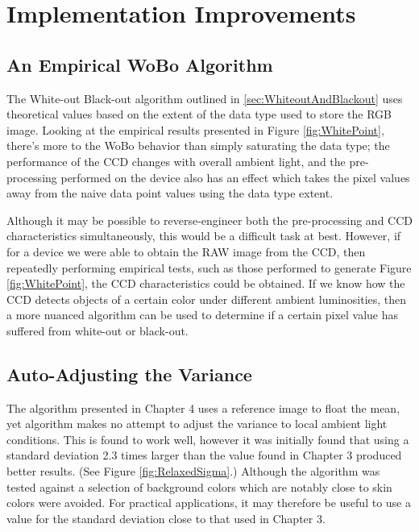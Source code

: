 \section{Implementation Improvements}\label{sec:ImplementationImprovements}

\subsection{An Empirical WoBo Algorithm}\label{sec:EmpicialWoBoAlgorithm}
The White-out Black-out algorithm outlined in \ref{sec:WhiteoutAndBlackout} uses theoretical values based on the extent of the data type used to store the RGB image. Looking at the empirical results presented in Figure \ref{fig:WhitePoint}, there's more to the WoBo behavior than simply saturating the data type; the performance of the CCD changes with overall ambient light, and the pre-processing performed on the device also has an effect which takes the pixel values away from the naive data point values using the data type extent. 

Although it may be possible to reverse-engineer both the pre-processing and CCD characteristics simultaneously, this would be a difficult task at best. However, if for a device we were able to obtain the RAW image from the CCD, then repeatedly performing empirical tests, such as those performed to generate Figure \ref{fig:WhitePoint}, the CCD characteristics could be obtained. If we know how the CCD detects objects of a certain color under different ambient luminosities, then a more nuanced algorithm can be used to determine if a certain pixel value has suffered from white-out or black-out.

\subsection{Auto-Adjusting the Variance}\label{sec:AutoAdjustingTheVariance}
The algorithm presented in Chapter 4 uses a reference image to float the mean, yet algorithm makes no attempt to adjust the variance to local ambient light conditions. This is found to work well, however it was initially found that using a standard deviation 2.3 times larger than the value found in Chapter 3 produced better results. (See Figure \ref{fig:RelaxedSigma}.) Although the algorithm was tested against a selection of background colors which are notably close to skin colors were avoided. For practical applications, it may therefore be useful to use a value for the standard deviation close to that used in Chapter 3.

